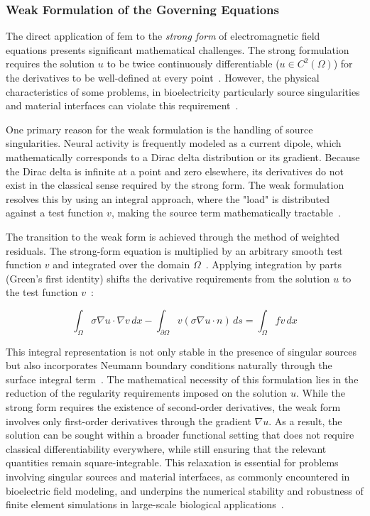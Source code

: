 \subsubsection{Weak Formulation of the Governing Equations}
The direct application of \gls{fem} to the \textit{strong form} of electromagnetic field equations presents significant mathematical challenges. The strong formulation requires the solution $u$ to be twice continuously differentiable ($u \in C^2(\Omega)$) for the derivatives to be well-defined at every point~\cite{alberta}. However, the physical characteristics of some problems, in bioelectricity particularly source singularities and material interfaces can violate this requirement~\cite{ockendon}.


One primary reason for the weak formulation is the handling of source singularities. Neural activity is frequently modeled as a current dipole, which mathematically corresponds to a Dirac delta distribution or its gradient. Because the Dirac delta is infinite at a point and zero elsewhere, its derivatives do not exist in the classical sense required by the strong form. The weak formulation resolves this by using an integral approach, where the "load" is distributed against a test function $v$, making the source term mathematically tractable~\cite{alberta, valli-maths, ockendon}.


The transition to the weak form is achieved through the method of weighted residuals. The strong-form equation is multiplied by an arbitrary smooth test function $v$ and integrated over the domain $\Omega$~\cite{fem-org}. Applying integration by parts (Green's first identity) shifts the derivative requirements from the solution $u$ to the test function $v$~\cite{ockendon,fem-org}:

$$\int_{\Omega} \sigma \nabla u \cdot \nabla v \, dx - \int_{\partial \Omega} v (\sigma \nabla u \cdot n) \, ds = \int_{\Omega} f v \, dx$$


This integral representation is not only stable in the presence of singular sources but also incorporates Neumann boundary conditions naturally through the surface integral term~\cite{ockendon}. The mathematical necessity of this formulation lies in the reduction of the regularity requirements imposed on the solution \(u\). While the strong form requires the existence of second-order derivatives, the weak form involves only first-order derivatives through the gradient \(\nabla u\). As a result, the solution can be sought within a broader functional setting that does not require classical differentiability everywhere, while still ensuring that the relevant quantities remain square-integrable. This relaxation is essential for problems involving singular sources and material interfaces, as commonly encountered in bioelectric field modeling, and underpins the numerical stability and robustness of finite element simulations in large-scale biological applications~\cite{ockendon, alberta}.


